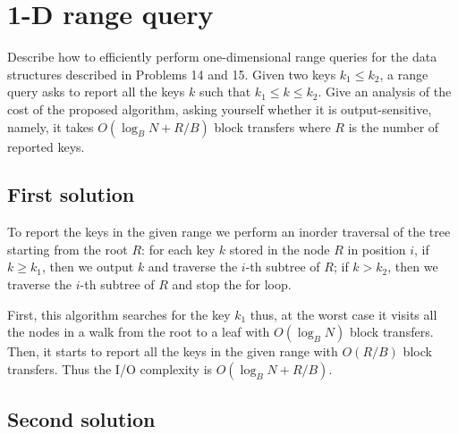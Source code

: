 \section{1-D range query}
Describe how to efficiently perform one-dimensional range queries for the data structures described in Problems 14 and 15. Given two keys $k_1 \leq k_2$, a range query asks to report all the keys $k$ such that $k_1 \leq k \leq k_2$. Give an analysis of the cost of the proposed algorithm, asking yourself whether it is output-sensitive, namely, it takes $O(\log_B N + R/B)$ block transfers where $R$ is the number of reported keys.

\subsection{First solution}
To report the keys in the given range we perform an inorder traversal of the tree starting from the root $R$: for each key $k$ stored in the node $R$ in position $i$, if $k \geq k_1$, then we output $k$ and traverse the $i$-th subtree of $R$; if $k > k_2$, then we traverse the $i$-th subtree of $R$ and stop the for loop.
\begin{center}
\end{center}

First, this algorithm searches for the key $k_1$ thus, at the worst case it visits all the nodes in a walk from the root to a leaf with $O(\log_B N)$ block transfers. Then, it starts to report all the keys in the given range with $O(R/B)$ block transfers. Thus the I/O complexity is $O(\log_B N + R/B)$.

\subsection{Second solution}

